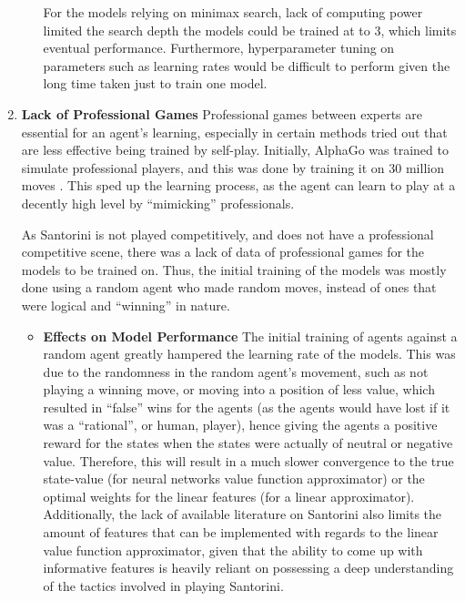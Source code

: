 \documentclass[a4paper,12pt,table]{article}
\begin{document}
\begin{enumerate}
\begin{itemize}
        For the models relying on minimax search, lack of computing power limited the search depth the models could be trained at to 3, which limits eventual performance. Furthermore, hyperparameter tuning on parameters such as learning rates would be difficult to perform given the long time taken just to train one model.

    \end{itemize}

    \item \textbf{Lack of Professional Games}
    \newline
    Professional games between experts are essential for an agent’s learning, especially in certain methods tried out that are less effective being trained by self-play. Initially, AlphaGo was trained to simulate professional players, and this was done by training it on 30 million moves \cite{Mastering the game of Go with deep neural networks and tree search}. This sped up the learning process, as the agent can learn to play at a decently high level by “mimicking” professionals.   \par

    As Santorini is not played competitively, and does not have a professional competitive scene, there was a lack of data of professional games for the models to be trained on. Thus, the initial training of the models was mostly done using a random agent who made random moves, instead of ones that were logical and “winning” in nature.
    
    \begin{itemize}
        \item \textbf{Effects on Model Performance}
        \newline
        The initial training of agents against a random agent greatly hampered the learning rate of the models. This was due to the randomness in the random agent’s movement, such as not playing a winning move, or moving into a position of less value, which resulted in “false” wins for the agents (as the agents would have lost if it was a “rational”, or human, player), hence giving the agents a positive reward for the states when the states were actually of neutral or negative value. Therefore, this will result in a much slower convergence to the true state-value (for neural networks value function approximator) or the optimal weights for the linear features (for a linear approximator). \\

        Additionally, the lack of available literature on Santorini also limits the amount of features that can be implemented with regards to the linear value function approximator, given that the ability to come up with informative features is heavily reliant on possessing a deep understanding of the tactics involved in playing Santorini.\\
    \newline
    \newline
    \end{itemize}
   

\end{enumerate}
\end{document}
